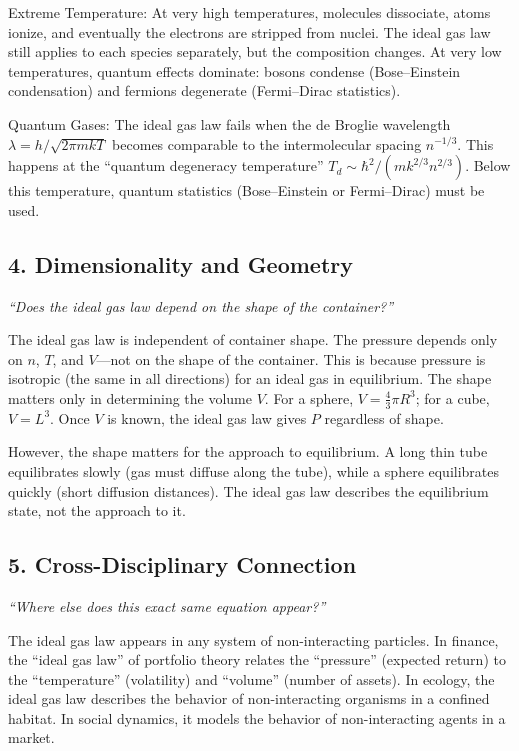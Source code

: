 \documentclass[11pt,openright]{book}
\begin{document}
Extreme Temperature: At very high temperatures, molecules dissociate, atoms ionize, and eventually the electrons are stripped from nuclei. The ideal gas law still applies to each species separately, but the composition changes. At very low temperatures, quantum effects dominate: bosons condense (Bose--Einstein condensation) and fermions degenerate (Fermi--Dirac statistics).

Quantum Gases: The ideal gas law fails when the de Broglie wavelength $\lambda = h/\sqrt{2\pi mkT}$ becomes comparable to the intermolecular spacing $n^{-1/3}$. This happens at the ``quantum degeneracy temperature'' $T_d \sim \hbar^2/(mk^{2/3}n^{2/3})$. Below this temperature, quantum statistics (Bose--Einstein or Fermi--Dirac) must be used.

\subsection*{4. Dimensionality and Geometry}
\textit{``Does the ideal gas law depend on the shape of the container?''}

The ideal gas law is independent of container shape. The pressure depends only on $n$, $T$, and $V$---not on the shape of the container. This is because pressure is isotropic (the same in all directions) for an ideal gas in equilibrium. The shape matters only in determining the volume $V$. For a sphere, $V = \frac{4}{3}\pi R^3$; for a cube, $V = L^3$. Once $V$ is known, the ideal gas law gives $P$ regardless of shape.

However, the shape matters for the approach to equilibrium. A long thin tube equilibrates slowly (gas must diffuse along the tube), while a sphere equilibrates quickly (short diffusion distances). The ideal gas law describes the equilibrium state, not the approach to it.

\subsection*{5. Cross-Disciplinary Connection}
\textit{``Where else does this exact same equation appear?''}

The ideal gas law appears in any system of non-interacting particles. In finance, the ``ideal gas law'' of portfolio theory relates the ``pressure'' (expected return) to the ``temperature'' (volatility) and ``volume'' (number of assets). In ecology, the ideal gas law describes the behavior of non-interacting organisms in a confined habitat. In social dynamics, it models the behavior of non-interacting agents in a market.
\end{document}
